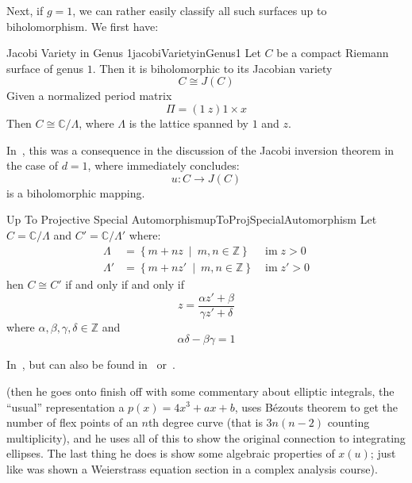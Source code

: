 \documentclass{book}
\newcommand{\C}{{\mathbb{C}}}
\newcommand{\Z}{{\mathbb{Z}}}
\newcommand{\im}{{\operatorname{im}}}
\newcommand{\set}[2]{\left\{#1 \ \middle|\ #2\right\}}
\begin{document}
Next, if $g = 1$, we can rather easily classify all such surfaces up to biholomorphism. We first have:

\begin{thm}{Jacobi Variety in Genus 1}{jacobiVarietyinGenus1}
  Let $C$ be a compact Riemann surface of genus $1$. Then it is biholomorphic to its Jacobian variety
  \[
    C \cong J(C)
  \]
  Given a normalized period matrix
  \[
    \Pi = (1\ z){1\times x}
  \]
  Then $C \cong \C/\Lambda$, where $\Lambda$ is the lattice spanned by $1$ and $z$.
\end{thm}

\begin{Proof}
  In~\cite[p.193]{a.griffithsIntroductionAlgebraicCurves}, this was a consequence in the discussion of the
  Jacobi inversion theorem in the case of $d= 1$, where immediately concludes:
  \[
    u: C \to J(C)
  \]
  is a biholomorphic mapping.
\end{Proof}

\begin{thm}{Up To Projective Special Automorphism}{upToProjSpecialAutomorphism}
  Let $C = \C/\Lambda$ and $C' = \C/\Lambda'$ where:
  \begin{align*}
    \Lambda &= \set{m + nz}{m,n \in \Z} & \im z > 0\\
    \Lambda' &= \set{m + nz'}{m,n \in \Z} & \im z' > 0
  \end{align*}
  hen $C \cong C'$ if and only if and only if
  \[
    z = \frac{\alpha z' + \beta}{\gamma z' + \delta}
  \]
   where $\alpha,\beta,\gamma,\delta \in \Z$ and
   \[
    \alpha\delta-\beta\gamma = 1
   \]
\end{thm}

\begin{Proof}
  In~\cite[p.194]{a.griffithsIntroductionAlgebraicCurves}, but can also be found
  in~\cite{silvermanAdvancedTopicsArithmetic1994} or~\cite{NateEllipticCurve}.
\end{Proof}

(then he goes onto finish off with some commentary about elliptic integrals, the ``usual'' representation
a $p(x) = 4x^3 + ax + b$, uses B\'ezouts theorem to get the number of flex points of an $n$th degree curve
(that is $3n(n-2)$ counting multiplicity), and he uses all of this to show the original connection to
integrating ellipses. The last thing he does is show some algebraic properties of $x(u)$; just like was shown
a Weierstrass equation section in a complex analysis course).
\end{document}
